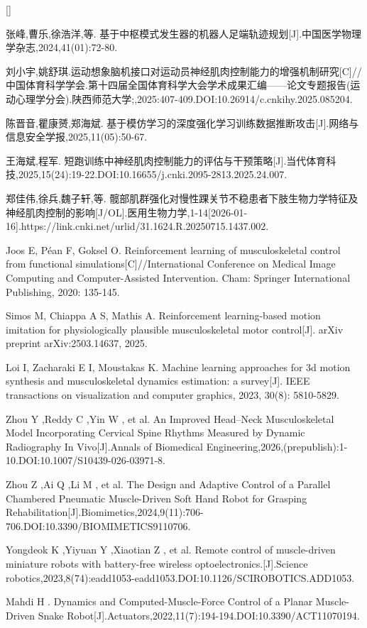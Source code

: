 \begin{list}{[]}{\setlength{\leftmargin}{2.6em}\setlength{\labelwidth}{2.2em}\setlength{\labelsep}{0.4em}\setlength{\itemsep}{0pt}\setlength{\parsep}{0pt}}
\item 张峰,曹乐,徐浩洋,等. 基于中枢模式发生器的机器人足端轨迹规划[J].中国医学物理学杂志,2024,41(01):72-80.
\item 刘小宇,姚舒琪.运动想象脑机接口对运动员神经肌肉控制能力的增强机制研究[C]//中国体育科学学会.第十四届全国体育科学大会学术成果汇编——论文专题报告(运动心理学分会).陕西师范大学;,2025:407-409.DOI:10.26914/c.cnkihy.2025.085204.
\item 陈晋音,瞿康赟,郑海斌. 基于模仿学习的深度强化学习训练数据推断攻击[J].网络与信息安全学报,2025,11(05):50-67.
\item 王海斌,程军. 短跑训练中神经肌肉控制能力的评估与干预策略[J].当代体育科技,2025,15(24):19-22.DOI:10.16655/j.cnki.2095-2813.2025.24.007.
\item 郑佳伟,徐兵,魏子轩,等. 髋部肌群强化对慢性踝关节不稳患者下肢生物力学特征及神经肌肉控制的影响[J/OL].医用生物力学,1-14[2026-01-16].https://link.cnki.net/urlid/31.1624.R.20250715.1437.002.
\item Joos E, Péan F, Goksel O. Reinforcement learning of musculoskeletal control from functional simulations[C]//International Conference on Medical Image Computing and Computer-Assisted Intervention. Cham: Springer International Publishing, 2020: 135-145.
\item Simos M, Chiappa A S, Mathis A. Reinforcement learning-based motion imitation for physiologically plausible musculoskeletal motor control[J]. arXiv preprint arXiv:2503.14637, 2025.
\item Loi I, Zacharaki E I, Moustakas K. Machine learning approaches for 3d motion synthesis and musculoskeletal dynamics estimation: a survey[J]. IEEE transactions on visualization and computer graphics, 2023, 30(8): 5810-5829.
\item Zhou Y ,Reddy C ,Yin W , et al. An Improved Head--Neck Musculoskeletal Model Incorporating Cervical Spine Rhythms Measured by Dynamic Radiography In Vivo[J].Annals of Biomedical Engineering,2026,(prepublish):1-10.DOI:10.1007/S10439-026-03971-8.
\item Zhou Z ,Ai Q ,Li M , et al. The Design and Adaptive Control of a Parallel Chambered Pneumatic Muscle-Driven Soft Hand Robot for Grasping Rehabilitation[J].Biomimetics,2024,9(11):706-706.DOI:10.3390/BIOMIMETICS9110706.
\item Yongdeok K ,Yiyuan Y ,Xiaotian Z , et al. Remote control of muscle-driven miniature robots with battery-free wireless optoelectronics.[J].Science robotics,2023,8(74):eadd1053-eadd1053.DOI:10.1126/SCIROBOTICS.ADD1053.
\item Mahdi H . Dynamics and Computed-Muscle-Force Control of a Planar Muscle-Driven Snake Robot[J].Actuators,2022,11(7):194-194.DOI:10.3390/ACT11070194.

\end{list}
